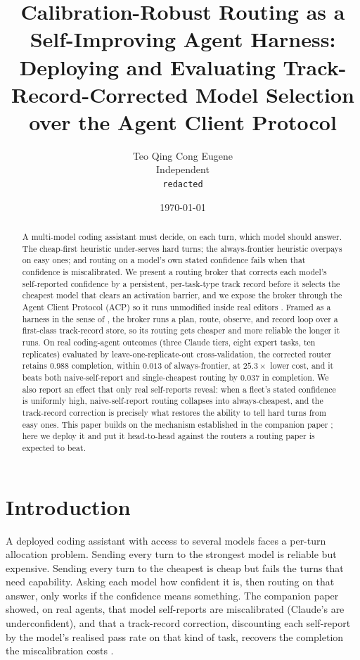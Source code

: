 \documentclass[11pt]{article}
\title{\bfseries Calibration-Robust Routing as a Self-Improving Agent Harness:\\ Deploying and Evaluating Track-Record-Corrected Model Selection over the Agent Client Protocol}
\author{Teo Qing Cong Eugene\\ \small Independent \\ \small \texttt{redacted}}
\date{\today}
\begin{document}
\maketitle

\begin{abstract}
\noindent
A multi-model coding assistant must decide, on each turn, which model should answer. The cheap-first heuristic under-serves hard turns; the always-frontier heuristic overpays on easy ones; and routing on a model's own stated confidence fails when that confidence is miscalibrated. We present a routing broker that corrects each model's self-reported confidence by a persistent, per-task-type track record before it selects the cheapest model that clears an activation barrier, and we expose the broker through the Agent Client Protocol (ACP) so it runs unmodified inside real editors \citep{acp2025}. Framed as a harness in the sense of \citet{weng2026harness}, the broker runs a plan, route, observe, and record loop over a first-class track-record store, so its routing gets cheaper and more reliable the longer it runs. On real coding-agent outcomes (three Claude tiers, eight expert tasks, ten replicates) evaluated by leave-one-replicate-out cross-validation, the corrected router retains $0.988$ completion, within $0.013$ of always-frontier, at $25.3\times$ lower cost, and it beats both naive-self-report and single-cheapest routing by $0.037$ in completion. We also report an effect that only real self-reports reveal: when a fleet's stated confidence is uniformly high, naive-self-report routing collapses into always-cheapest, and the track-record correction is precisely what restores the ability to tell hard turns from easy ones. This paper builds on the mechanism established in the companion paper \citep{teo2026cta}; here we deploy it and put it head-to-head against the routers a routing paper is expected to beat.
\end{abstract}

\section{Introduction}

A deployed coding assistant with access to several models faces a per-turn allocation problem. Sending every turn to the strongest model is reliable but expensive. Sending every turn to the cheapest is cheap but fails the turns that need capability. Asking each model how confident it is, then routing on that answer, only works if the confidence means something. The companion paper showed, on real agents, that model self-reports are miscalibrated (Claude's are underconfident), and that a track-record correction, discounting each self-report by the model's realised pass rate on that kind of task, recovers the completion the miscalibration costs \citep{teo2026cta}.
\end{document}
